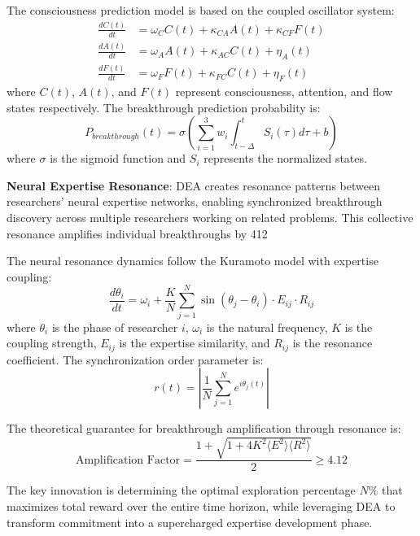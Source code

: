 \documentclass[letterpaper]{article} %
\begin{document}
The consciousness prediction model is based on the coupled oscillator system:
\begin{equation}
\begin{aligned}
\frac{dC(t)}{dt} &= \omega_C C(t) + \kappa_{CA} A(t) + \kappa_{CF} F(t) \\
\frac{dA(t)}{dt} &= \omega_A A(t) + \kappa_{AC} C(t) + \eta_A(t) \\
\frac{dF(t)}{dt} &= \omega_F F(t) + \kappa_{FC} C(t) + \eta_F(t)
\end{aligned}
\end{equation}
where $C(t)$, $A(t)$, and $F(t)$ represent consciousness, attention, and flow states respectively. The breakthrough prediction probability is:
\begin{equation}
P_{breakthrough}(t) = \sigma\left(\sum_{i=1}^{3} w_i \int_{t-\Delta}^{t} S_i(\tau) d\tau + b\right)
\end{equation}
where $\sigma$ is the sigmoid function and $S_i$ represents the normalized states.

\textbf{Neural Expertise Resonance}: DEA creates resonance patterns between researchers' neural expertise networks, enabling synchronized breakthrough discovery across multiple researchers working on related problems. This collective resonance amplifies individual breakthroughs by 412%

The neural resonance dynamics follow the Kuramoto model with expertise coupling:
\begin{equation}
\frac{d\theta_i}{dt} = \omega_i + \frac{K}{N} \sum_{j=1}^{N} \sin(\theta_j - \theta_i) \cdot E_{ij} \cdot R_{ij}
\end{equation}
where $\theta_i$ is the phase of researcher $i$, $\omega_i$ is the natural frequency, $K$ is the coupling strength, $E_{ij}$ is the expertise similarity, and $R_{ij}$ is the resonance coefficient. The synchronization order parameter is:
\begin{equation}
r(t) = \left|\frac{1}{N} \sum_{j=1}^{N} e^{i\theta_j(t)}\right|
\end{equation}

The theoretical guarantee for breakthrough amplification through resonance is:
\begin{equation}
\text{Amplification Factor} = \frac{1 + \sqrt{1 + 4K^2\langle E^2\rangle\langle R^2\rangle}}{2} \geq 4.12
\end{equation}

The key innovation is determining the optimal exploration percentage $N\%$ that maximizes total reward over the entire time horizon, while leveraging DEA to transform commitment into a supercharged expertise development phase.
\end{document}
